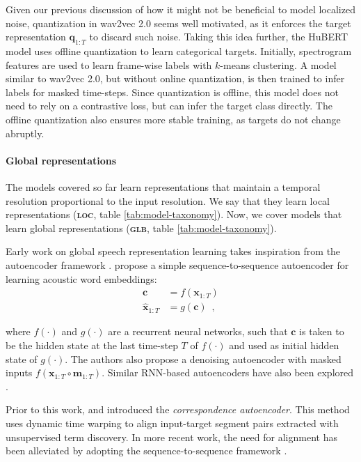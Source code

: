 {Given our previous discussion of how it might not be beneficial to model localized noise, quantization in wav2vec 2.0 seems well motivated, as it enforces the target representation $\mathbf{q}_{1:T}$ to discard such noise. Taking this idea further, the HuBERT model \cite{hsu_hubert_2021} uses offline quantization to learn categorical targets. Initially, spectrogram features are used to learn frame-wise labels with $k$-means clustering. A model similar to wav2vec 2.0, but without online quantization, is then trained to infer labels for masked time-steps. Since quantization is offline, this model does not need to rely on a contrastive loss, but can infer the target class directly. The offline quantization also ensures more stable training, as targets do not change abruptly.


\paragraph{Global representations}
The models covered so far learn representations that maintain a temporal resolution proportional to the input resolution. We say that they learn local representations (\textbf{\textsc{loc}}, table \ref{tab:model-taxonomy}). Now, we cover models that learn global representations (\textbf{\textsc{glb}}, table \ref{tab:model-taxonomy}).
 
Early work on global speech representation learning takes inspiration from the autoencoder framework \cite{kramer_nonlinear_1991}. \citet{chung_audio_2016} propose a simple sequence-to-sequence autoencoder for learning acoustic word embeddings:
\begin{align}
    \mathbf{c} &= f(\mathbf{x}_{1:T}) \\
    \hat{\mathbf{x}}_{1:T} &= g(\mathbf{c}) \enspace , \label{eq_brief:dec-aw2v}
\end{align}

\noindent where $f(\cdot)$ and $g(\cdot)$ are a recurrent neural networks, such that $\mathbf{c}$ is taken to be the hidden state at the last time-step $T$ of $f(\cdot)$ and used as initial hidden state of $g(\cdot)$. 
The authors also propose a denoising autoencoder with masked inputs $f(\mathbf{x}_{1:T} \circ \mathbf{m}_{1:T})$. Similar RNN-based autoencoders have also been explored \cite{kamper_truly_2019, holzenberger_learning_2018}.

Prior to this work, \citet{kamper_unsupervised_2015} and \citet{renshaw_comparison_2015} introduced the \textit{correspondence autoencoder}. This method uses dynamic time warping to align input-target segment pairs extracted with unsupervised term discovery. In more recent work, the need for alignment has been alleviated by adopting the sequence-to-sequence framework \cite{kamper_truly_2019, jacobs_acoustic_2021}.

}
